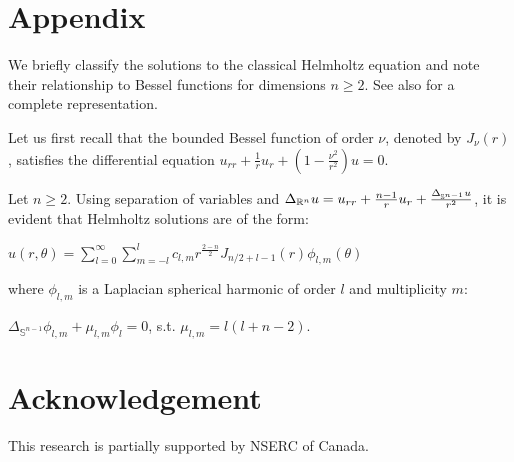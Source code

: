 \documentclass{article}
\begin{document}
\section{Appendix}

\label{sec1}

We briefly classify the solutions to the classical Helmholtz equation and note their relationship to Bessel functions for dimensions $n \ge 2$. See also \cite{Agmon} for a complete representation.

Let us first recall that the bounded Bessel function of order $\nu$, denoted by $J_\nu (r)$, satisfies the differential equation $u_{rr}+\frac{1}{r}u_r+(1-\frac{\nu^2}{r^2})u=0$.

Let $n\geq 2$. Using separation of variables and  $\Delta_{\mathbb{R}^n}u=u_{rr}+\frac{n-1}{r}u_r + \frac{\Delta_{\mathbb{S}^{n-1}}u}{r^2}$, it is evident that Helmholtz solutions are of the form:
\begin{center}
$u(r, \theta)=\sum\limits_{l=0}^{\infty} \sum\limits_{m=-l}^{l} c_{l,m} r^{\frac{2-n}{2}}J_{n/2+l-1}(r) \phi_{l,m}(\theta)$
    \end{center}
where     $\phi_{l,m}$ is a Laplacian spherical harmonic of order $l$ and multiplicity $m$:
\begin{center}
$\Delta_{\mathbb{S}^{n-1}}\phi_{l,m} + \mu_{l,m}\phi_l=0$, s.t. $\mu_{l,m} = l(l+n-2)$. 
\end{center}


\section*{Acknowledgement}
This research is partially supported by NSERC of Canada.



\printbibliography
\end{document}
